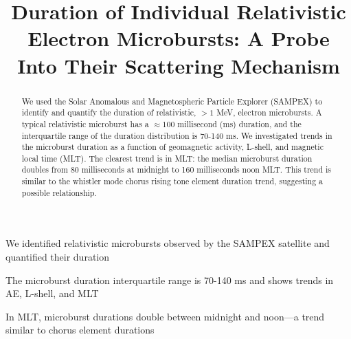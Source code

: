\documentclass[draft]{agujournal2019}
\begin{document}
%
%



\title{Duration of Individual Relativistic Electron Microbursts: A Probe Into Their Scattering Mechanism}






\begin{keypoints}
\item We identified relativistic microbursts observed by the SAMPEX satellite and quantified their duration
\item The microburst duration interquartile range is 70-140 ms and shows trends in AE, L-shell, and MLT
\item In MLT, microburst durations double between midnight and noon---a trend similar to chorus element durations
\end{keypoints}

\begin{abstract}
We used the Solar Anomalous and Magnetospheric Particle Explorer (SAMPEX) to identify and quantify the duration of relativistic, $>1$ MeV, electron microbursts. A typical relativistic microburst has a $\approx 100$ millisecond (ms) duration, and the interquartile range of the duration distribution is 70-140 ms. We investigated trends in the microburst duration as a function of geomagnetic activity, L-shell, and magnetic local time (MLT). The clearest trend is in MLT: the median microburst duration doubles from 80 milliseconds at midnight to 160 milliseconds noon MLT. This trend is similar to the whistler mode chorus rising tone element duration trend, suggesting a possible relationship.
\end{abstract}
\end{document}
